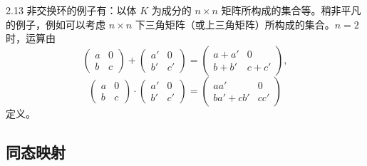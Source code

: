 \begin{example}{2.13} 非交换环的例子有：以体 $K$ 为成分的 $n\times n$ 矩阵所构成的集合等。稍非平凡的例子，例如可以考虑 $n\times n$ 下三角矩阵（或上三角矩阵）所构成的集合。$n=2$ 时，运算由
\[
  \begin{pmatrix} a & 0 \\ b & c \end{pmatrix}
  + \begin{pmatrix} a' & 0 \\ b' & c' \end{pmatrix}
  = \begin{pmatrix} a+a' & 0 \\ b+b' & c+c' \end{pmatrix},
\]
\[
  \begin{pmatrix} a & 0 \\ b & c \end{pmatrix}
  \cdot \begin{pmatrix} a' & 0 \\ b' & c' \end{pmatrix}
  = \begin{pmatrix} aa' & 0 \\ ba'+cb' & cc' \end{pmatrix}
\]
定义。\end{example}


\subsection{同态映射}

